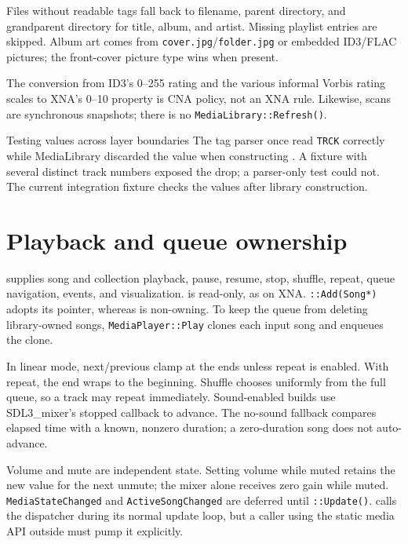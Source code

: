 Files without readable tags fall back to filename, parent directory, and grandparent directory
for title, album, and artist. Missing playlist entries are skipped. Album art comes from
\texttt{cover.jpg}/\texttt{folder.jpg} or embedded ID3/FLAC pictures; the front-cover picture
type wins when present.

The conversion from ID3's 0--255 rating and the various informal Vorbis rating scales to XNA's
0--10 property is CNA policy, not an XNA rule. Likewise, scans are synchronous snapshots;
there is no \texttt{MediaLibrary::Refresh()}.

\begin{historynote}{Testing values across layer boundaries}
The tag parser once read \texttt{TRCK} correctly while MediaLibrary discarded the value when
constructing . A fixture with several distinct track numbers exposed the drop;
a parser-only test could not. The current integration fixture checks the values after library
construction.
\end{historynote}

\section{Playback and queue ownership}

 supplies song and collection playback, pause, resume, stop, shuffle,
repeat, queue navigation, events, and visualization.  is read-only, as on
XNA. \texttt{::Add(Song*)} adopts its pointer, whereas
 is non-owning. To keep the queue from deleting library-owned songs,
\texttt{MediaPlayer::Play} clones each input song and enqueues the clone.

In linear mode, next/previous clamp at the ends unless repeat is enabled. With repeat, the end
wraps to the beginning. Shuffle chooses uniformly from the full queue, so a track may repeat
immediately. Sound-enabled builds use SDL3\_mixer's stopped callback to advance. The no-sound
fallback compares elapsed time with a known, nonzero duration; a zero-duration song does not
auto-advance.

Volume and mute are independent state. Setting volume while muted retains the new value for the
next unmute; the mixer alone receives zero gain while muted. \texttt{MediaStateChanged} and
\texttt{ActiveSongChanged} are deferred until \texttt{::Update()}.
 calls the dispatcher during its normal update loop, but a caller using the
static media API outside  must pump it explicitly.

